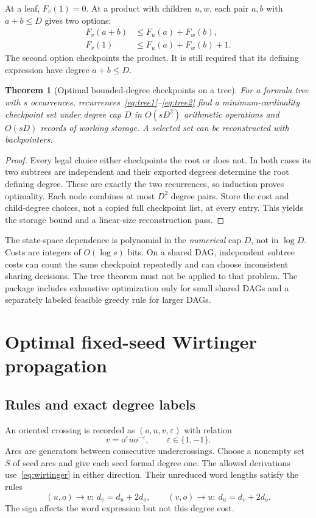 \documentclass[11pt]{article}
\newtheorem{theorem}{Theorem}[section]
\theoremstyle{definition}
\theoremstyle{remark}
\newcommand{\eps}{\varepsilon}
\begin{document}
At a leaf, $F_v(1)=0$. At a product with children $u,w$, each pair $a,b$ with $a+b\le D$ gives two options:
\begin{align}
F_v(a+b)&\le F_u(a)+F_w(b),\label{eq:tree1}\\
F_v(1)&\le F_u(a)+F_w(b)+1.\label{eq:tree2}
\end{align}
The second option checkpoints the product. It is still required that its defining expression have degree $a+b\le D$.

\begin{theorem}[Optimal bounded-degree checkpoints on a tree]
For a formula tree with $s$ occurrences, recurrences~\eqref{eq:tree1}--\eqref{eq:tree2} find a minimum-cardinality checkpoint set under degree cap $D$ in $O(sD^2)$ arithmetic operations and $O(sD)$ records of working storage. A selected set can be reconstructed with backpointers.
\end{theorem}
\begin{proof}
Every legal choice either checkpoints the root or does not. In both cases its two subtrees are independent and their exported degrees determine the root defining degree. These are exactly the two recurrences, so induction proves optimality. Each node combines at most $D^2$ degree pairs. Store the cost and child-degree choices, not a copied full checkpoint list, at every entry. This yields the storage bound and a linear-size reconstruction pass.
\end{proof}
The state-space dependence is polynomial in the \emph{numerical} cap $D$, not in $\log D$. Costs are integers of $O(\log s)$ bits. On a shared DAG, independent subtree costs can count the same checkpoint repeatedly and can choose inconsistent sharing decisions. The tree theorem must not be applied to that problem. The package includes exhaustive optimization only for small shared DAGs and a separately labeled feasible greedy rule for larger DAGs.

\section{Optimal fixed-seed Wirtinger propagation}
\label{sec:seeds}

\subsection{Rules and exact degree labels}
An oriented crossing is recorded as $(o,u,v,\eps)$ with relation
\begin{equation}
v=o^\eps u o^{-\eps},\qquad \eps\in\{1,-1\}.
\label{eq:wirtinger}
\end{equation}
Arcs are generators between consecutive undercrossings. Choose a nonempty set $S$ of seed arcs and give each seed formal degree one. The allowed derivations use~\eqref{eq:wirtinger} in either direction. Their unreduced word lengths satisfy the rules
\begin{equation}
(u,o)\longrightarrow v:\ d_v=d_u+2d_o,
\qquad
(v,o)\longrightarrow u:\ d_u=d_v+2d_o.
\label{eq:hyper}
\end{equation}
The sign affects the word expression but not this degree cost.
\end{document}
